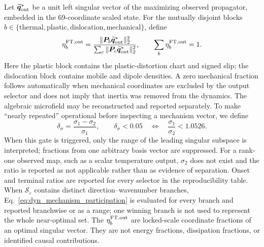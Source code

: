 Let $\widetilde{\boldsymbol q}_{\rm out}^*$ be a unit left singular vector of
the maximizing observed propagator, embedded in the 69-coordinate scaled
state.  For the mutually disjoint blocks
$b\in\{\mathrm{thermal},\mathrm{plastic},\mathrm{dislocation},
\mathrm{mechanical}\}$, define
\begin{equation}
 \eta_b^{\rm FT,out}
 =\frac{\|\boldsymbol P_b\widetilde{\boldsymbol q}_{\rm out}^*\|_2^2}
 {\sum_c\|\boldsymbol P_c\widetilde{\boldsymbol q}_{\rm out}^*\|_2^2},
 \qquad \sum_b\eta_b^{\rm FT,out}=1.
 \label{eq:dyn_mechanism_participation}
\end{equation}
Here the plastic block contains the plastic-distortion chart and signed slip;
the dislocation block contains mobile and dipole densities.  A zero mechanical
fraction follows automatically when mechanical coordinates are excluded by the
output selector and does not imply that inertia was removed from the dynamics.
The algebraic microfield may be reconstructed and reported separately.  To
make ``nearly repeated'' operational before inspecting a mechanism vector, we
define
\begin{equation}
 \delta_\sigma=\frac{\sigma_1-\sigma_2}{\sigma_1},\qquad
 \delta_\sigma<0.05
 \quad\Longleftrightarrow\quad
 \frac{\sigma_1}{\sigma_2}<1.0526 .
 \label{eq:dyn_singular_degeneracy_gate}
\end{equation}
When this gate is triggered, only the range of the leading singular subspace
is interpreted; fractions from one arbitrary basis vector are suppressed.
For a rank-one observed map, such as a scalar temperature output, $\sigma_2$
does not exist and the ratio is reported as not applicable rather than as
evidence of separation.  Onset and terminal ratios are reported for every
selector in the reproducibility table.
When $\mathcal S_\varepsilon$ contains distinct direction--wavenumber branches,
Eq.~\eqref{eq:dyn_mechanism_participation} is evaluated for every branch and
reported branchwise or as a range; one winning branch is not used to represent
the whole near-optimal set.
The $\eta_b^{\rm FT,out}$ are locked-scale coordinate fractions of an optimal singular
vector.  They are not energy fractions, dissipation fractions, or identified
causal contributions.

